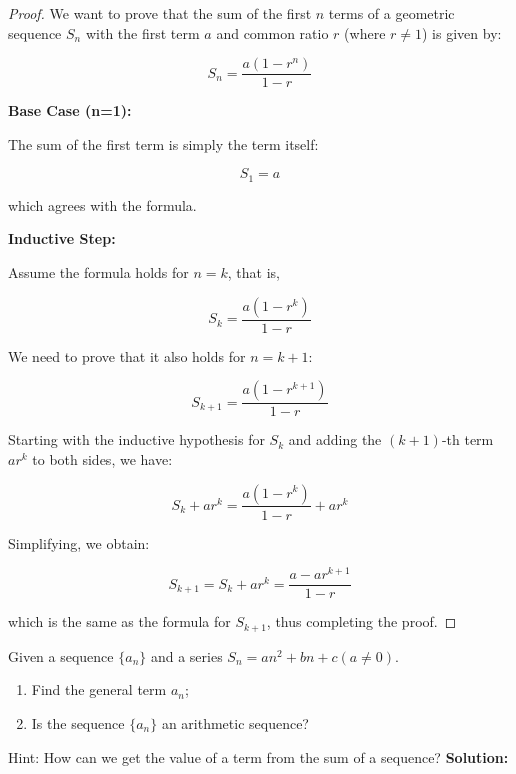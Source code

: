 \begin{proof}
    We want to prove that the sum of the first \( n \) terms of a geometric sequence \( S_n \) with the first term \( a \) and common ratio \( r \) (where \( r \neq 1 \)) is given by:

\[ S_n = \frac{a(1 - r^n)}{1 - r} \]

\textbf{Base Case (n=1):}

The sum of the first term is simply the term itself:

\[ S_1 = a \]

which agrees with the formula.

\textbf{Inductive Step:}

Assume the formula holds for \( n = k \), that is,

\[ S_k = \frac{a(1 - r^k)}{1 - r} \]

We need to prove that it also holds for \( n = k+1 \):

\[ S_{k+1} = \frac{a(1 - r^{k+1})}{1 - r} \]

Starting with the inductive hypothesis for \( S_k \) and adding the \( (k+1) \)-th term \( ar^k \) to both sides, we have:

\[ S_k + ar^k = \frac{a(1 - r^k)}{1 - r} + ar^k \]

Simplifying, we obtain:

\[ S_{k+1} = S_k + ar^k = \frac{a - ar^{k+1}}{1 - r} \]

which is the same as the formula for \( S_{k+1} \), thus completing the proof.
\end{proof}
\begin{exercise}
    Given a sequence \( \{a_n\} \) and a series \( S_n = an^2 + bn + c (a \neq 0) \).

\begin{enumerate}
    \item Find the general term \( a_n \);
    \item Is the sequence \( \{a_n\} \) an arithmetic sequence?
\end{enumerate}
\end{exercise}
Hint: How can we get the value of a term from the sum of a sequence?
\textbf{Solution:}

